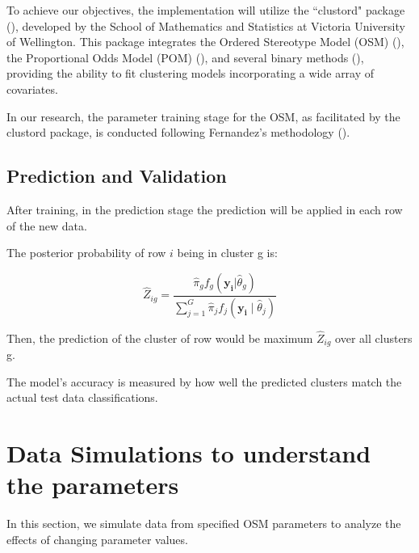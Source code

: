 \documentclass{article}
\begin{document}
To achieve our objectives, the implementation will utilize the ``clustord" package (\cite{clustord2024}), 
developed by the School of Mathematics and Statistics at Victoria University of Wellington. 
This package integrates the Ordered Stereotype Model (OSM) (\cite{fernandez2016mixture}), the Proportional Odds Model (POM) (\cite{matechou2016biclustering}), and several binary methods (\cite{pledger2014multivariate}), 
providing the ability to fit clustering models incorporating a wide array of covariates.

In our research, the parameter training stage for the OSM, as facilitated by the clustord package, is conducted following Fernandez's methodology (\cite{fernandez2016mixture}).

\subsection{Prediction and Validation}

After training, in the prediction stage the prediction will be applied in each row of the new data.

The posterior probability of row $i$ being in cluster g is:


\begin{equation}
  \hat{Z}_{ig} = \frac{\hat{\pi}_g f_g(\mathbf{y_i}|\hat{\theta}_g)}{\sum_{j=1}^{G} \hat{\pi}_j f_j(\mathbf{y_i} \mid \hat{\theta}_j)}
\end{equation}

Then, the prediction of the cluster of row would be maximum $\hat{Z}_{ig}$ over all clusters g.

The model's accuracy is measured by how well the predicted clusters match the actual test data classifications.

\section{Data Simulations to understand the parameters}

In this section, we simulate data from specified OSM parameters to analyze the effects of changing parameter values.
\end{document}
